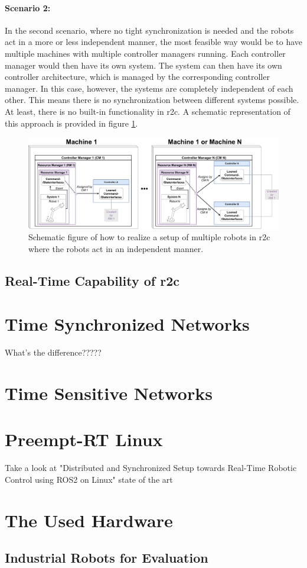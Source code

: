 \paragraph{Scenario 2:} 
In the second scenario, where no tight synchronization is needed and the robots act in a more or less independent manner, the most feasible way would be to have multiple machines with multiple controller managers running. Each controller manager would then have its own system. The system can then have its own controller architecture, which is managed by the corresponding controller manager. \newline
In this case, however, the systems are completely independent of each other. This means there is no synchronization between different systems possible. At least, there is no built-in functionality in \gls{r2c}. A schematic representation of this approach is provided in figure \ref{c3_fig_r2c_mr_is}.
\begin{figure}[htbp]
	\centering
	\includegraphics[width=1\textwidth]{Figures/c3/multiple_independent_robots_current.pdf}
	\caption{Schematic figure of how to realize a setup of multiple robots in \gls{r2c} where the robots act in an independent manner.}
	\label{c3_fig_r2c_mr_is}
\end{figure}


\subsection{Real-Time Capability of \gls{r2c}}

\section{Time Synchronized Networks}
What's the difference?????
\section{Time Sensitive Networks}

\section{Preempt-RT Linux}
Take a look at "Distributed and Synchronized Setup towards Real-Time Robotic Control using ROS2 on Linux" state of the art

\section{The Used Hardware}
\subsection{Industrial Robots for Evaluation}





